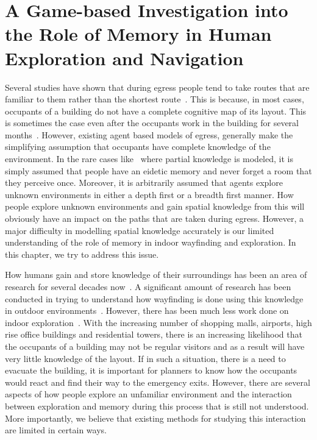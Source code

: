 
\chapter{A Game-based Investigation into the Role of Memory in Human Exploration and Navigation}
\label{chapter:SpatialKnowledgeChapter}

Several studies have shown that during egress people tend to take routes that are familiar to them rather than the shortest route~\cite{Mawson:2005tq,Paulsen:1984ti,Ramachandran:1990wj,Sandberg:1997tw}. This is because, in most cases, occupants of a building do not have a complete cognitive map of its layout. This is sometimes the case even after the occupants work in the building for several months~\cite{Moeser01011988}. However, existing agent based models of egress, generally make the simplifying assumption that occupants have complete knowledge of the environment. In the rare cases like~\cite{Pelechano:2006ba} where partial knowledge is modeled, it is simply assumed that people have an eidetic memory and never forget a room that they perceive once. Moreover, it is arbitrarily assumed that agents explore unknown environments in either a depth first or a breadth first manner. How people explore unknown environments and gain spatial knowledge from this will obviously have an impact on the paths that are taken during egress. However, a major difficulty in modelling spatial knowledge accurately is our limited understanding of the role of memory in indoor wayfinding and exploration. In this chapter, we try to address this issue.






How humans gain and store knowledge of their surroundings has been an area of research for several decades now~\cite{lynch_image_1960,Thorndyke1982560,Kuipers78,Siegel19759,Kuipers01012003}. A significant amount of research has been conducted in trying to understand how wayfinding is done using this knowledge in outdoor environments~\cite{Kuipers78,Gopal1989309}. However, there has been much less work done on indoor exploration~\cite{Kuipers01012003,HolscherBMS06,stankiewicz2006lost,stankiewicz2007acquistion}. With the increasing number of shopping malls, airports, high rise office buildings and residential towers, there is an increasing likelihood that the occupants of a building may not be regular visitors and as a result will have very little knowledge of the layout. If in such a situation, there is a need to evacuate the building, it is important for planners to know how the occupants would react and find their way to the emergency exits. However, there are several aspects of how people explore an unfamiliar environment and the interaction between exploration and memory during this process that is still not understood. More importantly, we believe that existing methods for studying this interaction are limited in certain ways.

